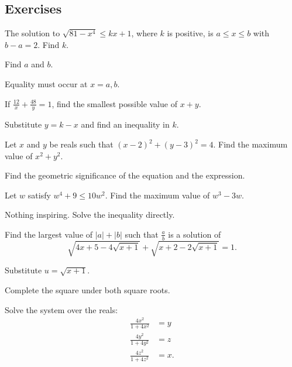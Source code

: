 \documentclass[../jarvis.tex]{subfiles}
\begin{document}
\subsection{Exercises}
\problem[2021 SMO(O) P4]The solution to $\sqrt{81-x^4}\leq kx+1$, where $k$ is positive, is $a\leq x\leq b$ with $b-a=2$. Find $k$.
\begin{hints}
    \begin{hint}
        Find $a$ and $b$.
    \end{hint}
    \begin{hint}
        Equality must occur at $x=a, b$.
    \end{hint}
\end{hints}
\problem[2022 SMO(S) P16]If $\frac{12}{x}+\frac{48}{y}=1$, find the smallest possible value of $x+y$.
\begin{hints}
    \begin{hint}
        Substitute $y=k-x$ and find an inequality in $k$.
    \end{hint}
\end{hints}
\problem[2022 SMO(O) P8]Let $x$ and $y$ be reals such that $(x-2)^2+(y-3)^2=4$. Find the maximum value of $x^2+y^2$.
\begin{hints}
    \begin{hint}
        Find the geometric significance of the equation and the expression.
    \end{hint}
\end{hints}
\problem[2022 SMO(O) P9]Let $w$ satisfy $w^4+9\leq 10w^2$. Find the maximum value of $w^3-3w$.
\begin{hints}
    \begin{hint}
        Nothing inspiring. Solve the inequality directly.
    \end{hint}
\end{hints}
\problem[2022 SMO(O) P12]Find the largest value of $|a|+|b|$ such that $\frac{a}{b}$ is a solution of
$$\sqrt{4x+5-4\sqrt{x+1}}+\sqrt{x+2-2\sqrt{x+1}}=1.$$
\begin{hints}
    \begin{hint}
        Substitute $u=\sqrt{x+1}$.
    \end{hint}
    \begin{hint}
        Complete the square under both square roots.
    \end{hint}
\end{hints}
\problem[2022 SMO(O) P13] Solve the system over the reals:
\begin{align*}
    \frac{4x^2}{1+4x^2}&=y\\
    \frac{4y^2}{1+4y^2}&=z\\
    \frac{4z^2}{1+4z^2}&=x.
\end{align*}
\end{document}
